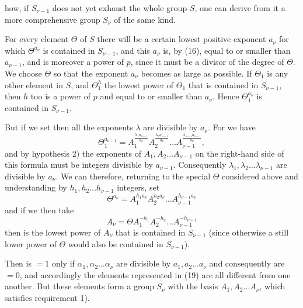 how, if $S_{\nu-1}$ does not yet exhaust the whole group $S$, one can derive from it a more comprehensive group $S_\nu$ of the same kind.

For every element $\Theta$ of $S$ there will be a certain lowest positive exponent $a_\nu$ for which $\Theta^{a_\nu}$ is contained in $S_{\nu-1}$, and this $a_\nu$ is, by (16), equal to or smaller than $a_{\nu-1}$, and is moreover a power of $p$, since it must be a divisor of the degree of $\Theta$. We choose $\Theta$ so that the exponent $a_\nu$ becomes as large as possible. If $\Theta_1$ is any other element in $S$, and $\Theta_1^h$ the lowest power of $\Theta_1$ that is contained in $S_{\nu-1}$, then $h$ too is a power of $p$ and equal to or smaller than $a_\nu$. Hence $\Theta_1^{a_\nu}$ is contained in $S_{\nu-1}$.

But if we set
then all the exponents $\lambda$ are divisible by $a_\nu$. For we have
\[
\Theta_1^{a_{\nu-1}} = A_1^{\frac{\lambda_1 a_{\nu-1}}{a_\nu}} A_2^{\frac{\lambda_2 a_{\nu-1}}{a_\nu}} \ldots A_{\nu-1}^{\frac{\lambda_{\nu-1} a_{\nu-1}}{a_\nu}},
\]
and by hypothesis 2) the exponents of $A_1, A_2 \ldots A_{\nu-1}$ on the right-hand side of this formula must be integers divisible by $a_{\nu-1}$. Consequently $\lambda_1, \lambda_2 \ldots \lambda_{\nu-1}$ are divisible by $a_\nu$. We can therefore, returning to the special $\Theta$ considered above and understanding by $h_1, h_2 \ldots h_{\nu-1}$ integers, set
\[
\Theta^{a_\nu} = A_1^{h_1 a_\nu} A_2^{h_2 a_\nu} \ldots A_{\nu-1}^{h_{\nu-1} a_\nu}
\]
and if we then take
\[
A_\nu = \Theta A_1^{-h_1} A_2^{-h_2} \ldots A_{\nu-1}^{-h_{\nu-1}}
\]
then
is the lowest power of $A_\nu$ that is contained in $S_{\nu-1}$ (since otherwise a still lower power of $\Theta$ would also be contained in $S_{\nu-1}$).

Then
is $= 1$ only if $\alpha_1, \alpha_2 \ldots \alpha_\nu$ are divisible by $a_1, a_2 \ldots a_\nu$ and consequently are $= 0$, and accordingly the elements represented in (19) are all different from one another. But these elements form a group $S_\nu$ with the basis $A_1, A_2 \ldots A_\nu$, which satisfies requirement 1).
